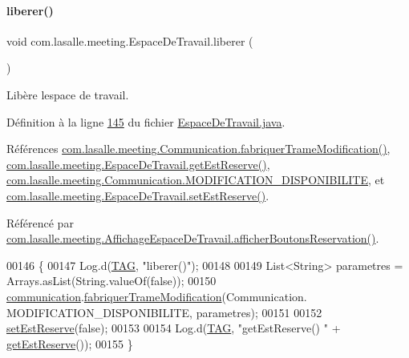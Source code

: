 \paragraph{\texorpdfstring{liberer()}{liberer()}}
{\footnotesize\ttfamily void com.\+lasalle.\+meeting.\+Espace\+De\+Travail.\+liberer (\begin{DoxyParamCaption}{ }\end{DoxyParamCaption})}



Libère l\textquotesingle{}espace de travail. 



Définition à la ligne \hyperlink{_espace_de_travail_8java_source_l00145}{145} du fichier \hyperlink{_espace_de_travail_8java_source}{Espace\+De\+Travail.\+java}.



Références \hyperlink{_communication_8java_source_l00222}{com.\+lasalle.\+meeting.\+Communication.\+fabriquer\+Trame\+Modification()}, \hyperlink{_espace_de_travail_8java_source_l00117}{com.\+lasalle.\+meeting.\+Espace\+De\+Travail.\+get\+Est\+Reserve()}, \hyperlink{_communication_8java_source_l00058}{com.\+lasalle.\+meeting.\+Communication.\+M\+O\+D\+I\+F\+I\+C\+A\+T\+I\+O\+N\+\_\+\+D\+I\+S\+P\+O\+N\+I\+B\+I\+L\+I\+TE}, et \hyperlink{_espace_de_travail_8java_source_l00122}{com.\+lasalle.\+meeting.\+Espace\+De\+Travail.\+set\+Est\+Reserve()}.



Référencé par \hyperlink{_affichage_espace_de_travail_8java_source_l00150}{com.\+lasalle.\+meeting.\+Affichage\+Espace\+De\+Travail.\+afficher\+Boutons\+Reservation()}.


\begin{DoxyCode}
00146     \{
00147         Log.d(\hyperlink{classcom_1_1lasalle_1_1meeting_1_1_espace_de_travail_a30a7c9d0d084360b166487dbcdf5bad1}{TAG}, \textcolor{stringliteral}{"liberer()"});
00148 
00149         List<String> parametres = Arrays.asList(String.valueOf(\textcolor{keyword}{false}));
00150         \hyperlink{classcom_1_1lasalle_1_1meeting_1_1_espace_de_travail_adbda10d59725486cb1151c050a830114}{communication}.\hyperlink{classcom_1_1lasalle_1_1meeting_1_1_communication_a82b49090e24d8296bfd26a14e0951ade}{fabriquerTrameModification}(Communication.
      MODIFICATION\_DISPONIBILITE, parametres);
00151 
00152         \hyperlink{classcom_1_1lasalle_1_1meeting_1_1_espace_de_travail_ae6609cc6e5c42c0be7936ef3a3748bd0}{setEstReserve}(\textcolor{keyword}{false});
00153 
00154         Log.d(\hyperlink{classcom_1_1lasalle_1_1meeting_1_1_espace_de_travail_a30a7c9d0d084360b166487dbcdf5bad1}{TAG}, \textcolor{stringliteral}{"getEstReserve() "} + \hyperlink{classcom_1_1lasalle_1_1meeting_1_1_espace_de_travail_a69fe30f8d3aff92986f4c39402e16ab0}{getEstReserve}());
00155     \}
\end{DoxyCode}
\mbox{\label{classcom_1_1lasalle_1_1meeting_1_1_espace_de_travail_a42d483a68e6d0d50707dbd3dddd164c2}} 
